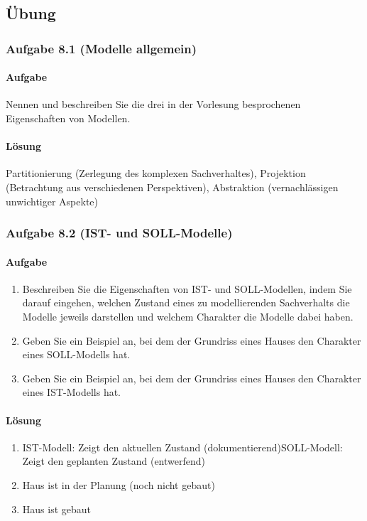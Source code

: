 \subsection{Übung}

\subsubsection*{Aufgabe 8.1 (Modelle allgemein)}
    \paragraph*{Aufgabe}
        Nennen und beschreiben Sie die drei in der Vorlesung besprochenen Eigenschaften von Modellen.
    \paragraph*{Lösung}
        Partitionierung (Zerlegung des komplexen Sachverhaltes), Projektion (Betrachtung aus verschiedenen Perspektiven), Abstraktion (vernachlässigen unwichtiger Aspekte)

\subsubsection*{Aufgabe 8.2 (IST- und SOLL-Modelle)}
    \paragraph*{Aufgabe}
        \begin{enumerate}[label=\alph*)]
            \item Beschreiben Sie die Eigenschaften von IST- und SOLL-Modellen, indem Sie darauf eingehen, welchen Zustand eines zu modellierenden Sachverhalts die Modelle jeweils darstellen und welchem Charakter die Modelle dabei haben.
            \item Geben Sie ein Beispiel an, bei dem der Grundriss eines Hauses den Charakter eines SOLL-Modells hat.
            \item Geben Sie ein Beispiel an, bei dem der Grundriss eines Hauses den Charakter eines IST-Modells hat.
        \end{enumerate}
    \paragraph*{Lösung}
        \begin{enumerate}[label=\alph*)]
            \item IST-Modell: Zeigt den aktuellen Zustand (dokumentierend)SOLL-Modell: Zeigt den geplanten Zustand (entwerfend)
            \item Haus ist in der Planung (noch nicht gebaut)
            \item Haus ist gebaut
        \end{enumerate}

